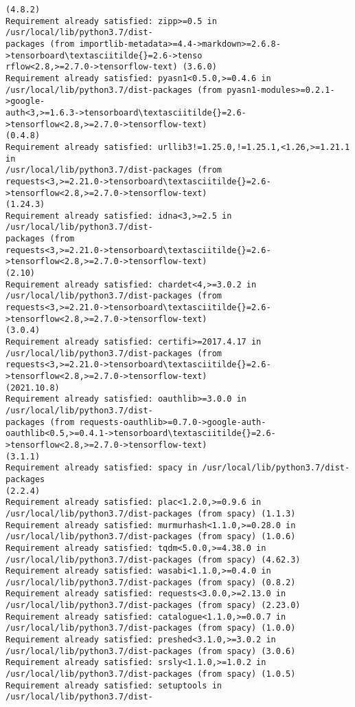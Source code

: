 \documentclass[11pt]{article}
\begin{document}
\begin{Verbatim}[commandchars=\\\{\}]
(4.8.2)
Requirement already satisfied: zipp>=0.5 in /usr/local/lib/python3.7/dist-
packages (from importlib-metadata>=4.4->markdown>=2.6.8->tensorboard\textasciitilde{}=2.6->tenso
rflow<2.8,>=2.7.0->tensorflow-text) (3.6.0)
Requirement already satisfied: pyasn1<0.5.0,>=0.4.6 in
/usr/local/lib/python3.7/dist-packages (from pyasn1-modules>=0.2.1->google-
auth<3,>=1.6.3->tensorboard\textasciitilde{}=2.6->tensorflow<2.8,>=2.7.0->tensorflow-text)
(0.4.8)
Requirement already satisfied: urllib3!=1.25.0,!=1.25.1,<1.26,>=1.21.1 in
/usr/local/lib/python3.7/dist-packages (from
requests<3,>=2.21.0->tensorboard\textasciitilde{}=2.6->tensorflow<2.8,>=2.7.0->tensorflow-text)
(1.24.3)
Requirement already satisfied: idna<3,>=2.5 in /usr/local/lib/python3.7/dist-
packages (from
requests<3,>=2.21.0->tensorboard\textasciitilde{}=2.6->tensorflow<2.8,>=2.7.0->tensorflow-text)
(2.10)
Requirement already satisfied: chardet<4,>=3.0.2 in
/usr/local/lib/python3.7/dist-packages (from
requests<3,>=2.21.0->tensorboard\textasciitilde{}=2.6->tensorflow<2.8,>=2.7.0->tensorflow-text)
(3.0.4)
Requirement already satisfied: certifi>=2017.4.17 in
/usr/local/lib/python3.7/dist-packages (from
requests<3,>=2.21.0->tensorboard\textasciitilde{}=2.6->tensorflow<2.8,>=2.7.0->tensorflow-text)
(2021.10.8)
Requirement already satisfied: oauthlib>=3.0.0 in /usr/local/lib/python3.7/dist-
packages (from requests-oauthlib>=0.7.0->google-auth-
oauthlib<0.5,>=0.4.1->tensorboard\textasciitilde{}=2.6->tensorflow<2.8,>=2.7.0->tensorflow-text)
(3.1.1)
Requirement already satisfied: spacy in /usr/local/lib/python3.7/dist-packages
(2.2.4)
Requirement already satisfied: plac<1.2.0,>=0.9.6 in
/usr/local/lib/python3.7/dist-packages (from spacy) (1.1.3)
Requirement already satisfied: murmurhash<1.1.0,>=0.28.0 in
/usr/local/lib/python3.7/dist-packages (from spacy) (1.0.6)
Requirement already satisfied: tqdm<5.0.0,>=4.38.0 in
/usr/local/lib/python3.7/dist-packages (from spacy) (4.62.3)
Requirement already satisfied: wasabi<1.1.0,>=0.4.0 in
/usr/local/lib/python3.7/dist-packages (from spacy) (0.8.2)
Requirement already satisfied: requests<3.0.0,>=2.13.0 in
/usr/local/lib/python3.7/dist-packages (from spacy) (2.23.0)
Requirement already satisfied: catalogue<1.1.0,>=0.0.7 in
/usr/local/lib/python3.7/dist-packages (from spacy) (1.0.0)
Requirement already satisfied: preshed<3.1.0,>=3.0.2 in
/usr/local/lib/python3.7/dist-packages (from spacy) (3.0.6)
Requirement already satisfied: srsly<1.1.0,>=1.0.2 in
/usr/local/lib/python3.7/dist-packages (from spacy) (1.0.5)
Requirement already satisfied: setuptools in /usr/local/lib/python3.7/dist-

\end{Verbatim}
\end{document}
